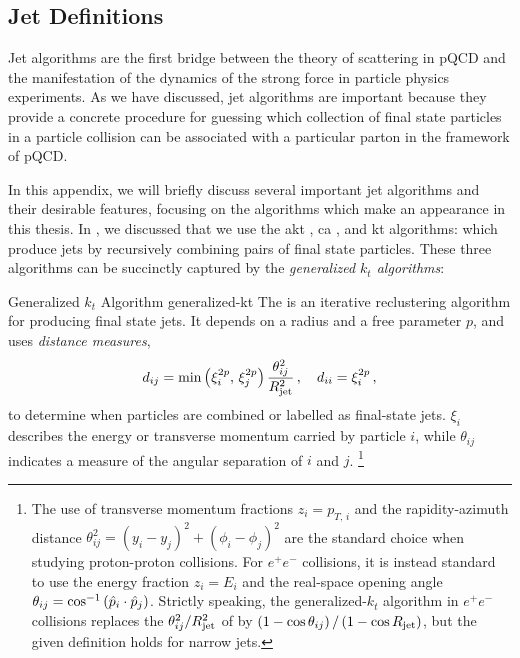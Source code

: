 \begin{subappendices}

\section{Jet Definitions}
\label{app:jet-definitions}

Jet algorithms are the first bridge between the theory of scattering in pQCD and the manifestation of the dynamics of the strong force in particle physics experiments.
%
As we have discussed, jet algorithms are important because they provide a concrete procedure for guessing which collection of final state particles in a particle collision can be associated with a particular parton in the framework of pQCD.

In this appendix, we will briefly discuss several important jet algorithms and their desirable features, focusing on the algorithms which make an appearance in this thesis.
%
In , we discussed that we use the \gls{akt} \cite{Cacciari:2008gp}, \gls{ca} \cite{Dokshitzer:1997in,Wobisch:1998wt}, and \gls{kt} \cite{Catani:1991hj,Catani:1993hr} algorithms:
%
 which produce jets by recursively combining pairs of final state particles.
%
These three algorithms can be succinctly captured by the \textit{generalized \(k_t\) algorithms}:
\cite{Cacciari:2011ma}

\begin{definitionbox}
        {Generalized \(k_t\) Algorithm}
        {generalized-kt}
    The  is an iterative \gls{reclustering} algorithm for producing final state jets.
    It depends on a radius \Rjet{} and a free parameter \(p\), and uses \emph{distance measures},
    \begin{align}
        \label{eq:gen-kt-measure}
        d_{ij}
        =
        \min\le(\xi_i^{2p},\, \xi_j^{2p}\ri)
        \frac{\theta_{ij}^2}{\Rjet^2}
        \,,
        \quad
        d_{ii}
        =
        \xi_i^{2p}
        \,,
    \end{align}
    to determine when particles are combined or labelled as final-state jets.
    \(\xi_i\) describes the energy or transverse momentum carried by particle \(i\), while \(\theta_{ij}\) indicates a measure of the angular separation of \(i\) and \(j\).%
    \footnote{
        The use of transverse momentum fractions \(z_i = p_{T,\,i}\) and the rapidity-azimuth distance \(\theta_{ij}^2 = (y_i-y_j)^2 + (\phi_i-\phi_j)^2\) are the standard choice when studying proton-proton collisions.
        For \(e^+ e^-\) collisions, it is instead standard to use the energy fraction \(z_i = E_i\) and the real-space opening angle \(\theta_{ij} = \cos^{-1}\left(\hat{p}_i \cdot \hat{p}_j\right)\).
        Strictly speaking, the generalized-\(k_t\) algorithm in \(e^+ e^-\) collisions replaces the \(\theta_{ij}^2/R_\text{jet}^2\) of  by \(\left(1-\cos\theta_{ij}\right)/\left(1-\cos R_\text{jet}\right)\), but the given definition holds for narrow jets.
    }


\end{definitionbox}
\end{subappendices}
